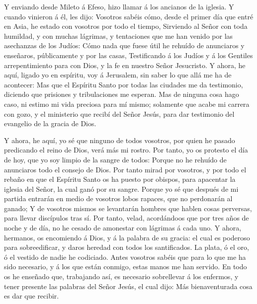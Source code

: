  Y enviando desde Mileto á Efeso, hizo llamar á los
ancianos de la iglesia.  Y cuando vinieron á él, les dijo:
Vosotros sabéis cómo, desde el primer día que entré en Asia, he estado
con vosotros por todo el tiempo,  Sirviendo al Señor con
toda humildad, y con muchas lágrimas, y tentaciones que me han venido
por las asechanzas de los Judíos:  Cómo nada que fuese útil
he rehuído de anunciaros y enseñaros, públicamente y por las casas,
 Testificando á los Judíos y á los Gentiles arrepentimiento
para con Dios, y la fe en nuestro Señor Jesucristo.  Y
ahora, he aquí, ligado yo en espíritu, voy á Jerusalem, sin saber lo que
allá me ha de acontecer:  Mas que el Espíritu Santo por
todas las ciudades me da testimonio, diciendo que prisiones y
tribulaciones me esperan.  Mas de ninguna cosa hago caso,
ni estimo mi vida preciosa para mí mismo; solamente que acabe mi carrera
con gozo, y el ministerio que recibí del Señor Jesús, para dar
testimonio del evangelio de la gracia de Dios.

 Y ahora, he aquí, yo sé que ninguno de todos vosotros, por
quien he pasado predicando el reino de Dios, verá más mi rostro.
 Por tanto, yo os protesto el día de hoy, que yo soy limpio
de la sangre de todos:  Porque no he rehuído de anunciaros
todo el consejo de Dios.  Por tanto mirad por vosotros, y
por todo el rebaño en que el Espíritu Santo os ha puesto por obispos,
para apacentar la iglesia del Señor, la cual ganó por su sangre.
 Porque yo sé que después de mi partida entrarán en medio
de vosotros lobos rapaces, que no perdonarán al ganado;  Y
de vosotros mismos se levantarán hombres que hablen cosas perversas,
para llevar discípulos tras sí.  Por tanto, velad,
acordándoos que por tres años de noche y de día, no he cesado de
amonestar con lágrimas á cada uno.  Y ahora, hermanos, os
encomiendo á Dios, y á la palabra de su gracia: el cual es poderoso para
sobreedificar, y daros heredad con todos los santificados. 
La plata, ó el oro, ó el vestido de nadie he codiciado. 
Antes vosotros sabéis que para lo que me ha sido necesario, y á los que
están conmigo, estas manos me han servido.  En todo os he
enseñado que, trabajando así, es necesario sobrellevar á los enfermos, y
tener presente las palabras del Señor Jesús, el cual dijo: Más
bienaventurada cosa es dar que recibir.

